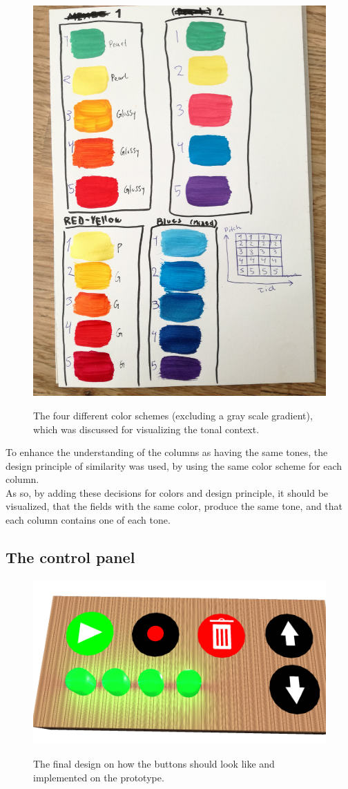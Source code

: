 \begin{figure}[H]
	\centering
	\includegraphics[width=0.5\linewidth]{figure/Design/colors}
	\label{fig:colors}
	\caption{The four different color schemes (excluding a gray scale gradient), which was discussed for visualizing the tonal context.}	
\end{figure}

To enhance the understanding of the columns as having the same tones, the design principle of similarity was used, by using the same color scheme for each column. \\
As so, by adding these decisions for colors and design principle, it should be visualized, that the fields with the same color, produce the same tone, and that each column contains one of each tone.  



\subsection{The control panel}

\begin{figure}[H]
	\centering
	\includegraphics[width=0.7\linewidth]{figure/Design/buttonDesign}
	\label{fig:buttonDesign}
	\caption{The final design on how the buttons should look like and implemented on the prototype.}	
\end{figure}

